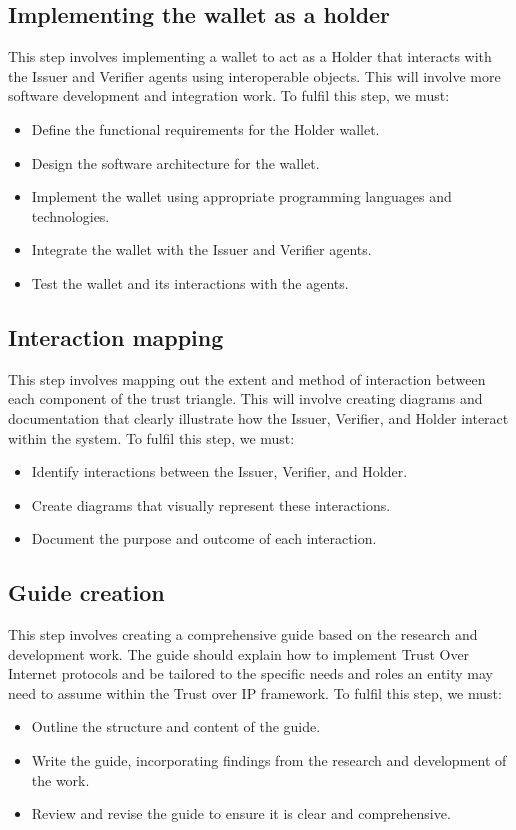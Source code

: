 \subsection{Implementing the wallet as a holder}
This step involves implementing a wallet to act as a Holder that interacts with the Issuer and Verifier agents using interoperable objects. This will involve more software development and integration work. To fulfil this step, we must:

\begin{itemize}
    \item Define the functional requirements for the Holder wallet.
    \item Design the software architecture for the wallet.
    \item Implement the wallet using appropriate programming languages and technologies.
    \item Integrate the wallet with the Issuer and Verifier agents.
    \item Test the wallet and its interactions with the agents.
\end{itemize}

\subsection{Interaction mapping}
This step involves mapping out the extent and method of interaction between each component of the trust triangle. This will involve creating diagrams and documentation that clearly illustrate how the Issuer, Verifier, and Holder interact within the system. To fulfil this step, we must:
\begin{itemize}
    \item Identify interactions between the Issuer, Verifier, and Holder.
    \item Create diagrams that visually represent these interactions.
    \item Document the purpose and outcome of each interaction.
\end{itemize}

\subsection{Guide creation}
This step involves creating a comprehensive guide based on the research and development work. The guide should explain how to implement Trust Over Internet protocols and be tailored to the specific needs and roles an entity may need to assume within the Trust over IP framework. To fulfil this step, we must:
\begin{itemize}
    \item Outline the structure and content of the guide.
    \item Write the guide, incorporating findings from the research and development of the work.
    \item Review and revise the guide to ensure it is clear and comprehensive.
\end{itemize} 


